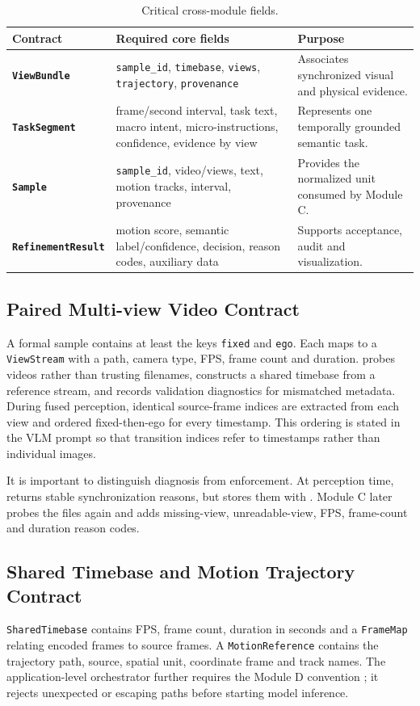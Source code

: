\documentclass[11pt,oneside]{report}
\begin{document}
\begin{table}[htbp]
\centering
\caption{Critical cross-module fields.}
\label{tab:data-contracts}
\begin{tabularx}{\textwidth}{>{\bfseries}p{} p{} X}
\toprule
Contract & Required core fields & Purpose \\
\midrule
\texttt{ViewBundle} &
\texttt{sample\_id}, \texttt{timebase}, \texttt{views},
\texttt{trajectory}, \texttt{provenance} &
Associates synchronized visual and physical evidence. \\
\texttt{TaskSegment} &
frame/second interval, task text, macro intent, micro-instructions, confidence,
evidence by view &
Represents one temporally grounded semantic task. \\
\texttt{Sample} &
\texttt{sample\_id}, video/views, text, motion tracks, interval, provenance &
Provides the normalized unit consumed by Module C. \\
\texttt{RefinementResult} &
motion score, semantic label/confidence, decision, reason codes, auxiliary data &
Supports acceptance, audit and visualization. \\
\bottomrule
\end{tabularx}
\end{table}

\subsection{Paired Multi-view Video Contract}
A formal sample contains at least the keys \texttt{fixed} and \texttt{ego}.
Each maps to a \texttt{ViewStream} with a path, camera type, FPS, frame count
and duration.  probes videos rather than trusting
filenames, constructs a shared timebase from a reference stream, and records
validation diagnostics for mismatched metadata. During fused perception,
identical source-frame indices are extracted from each view and ordered
fixed-then-ego for every timestamp. This ordering is stated in the VLM prompt so
that transition indices refer to timestamps rather than individual images.

It is important to distinguish diagnosis from enforcement. At perception time,
 returns stable synchronization reasons, but
 stores them with
. Module C later probes the files again and
adds missing-view, unreadable-view, FPS, frame-count and duration reason codes.

\subsection{Shared Timebase and Motion Trajectory Contract}
\texttt{SharedTimebase} contains FPS, frame count, duration in seconds and a
\texttt{FrameMap} relating encoded frames to source frames. A
\texttt{MotionReference} contains the trajectory path, source, spatial unit,
coordinate frame and track names. The application-level orchestrator further
requires the Module D convention
; it
rejects unexpected or escaping paths before starting model inference.
\end{document}
